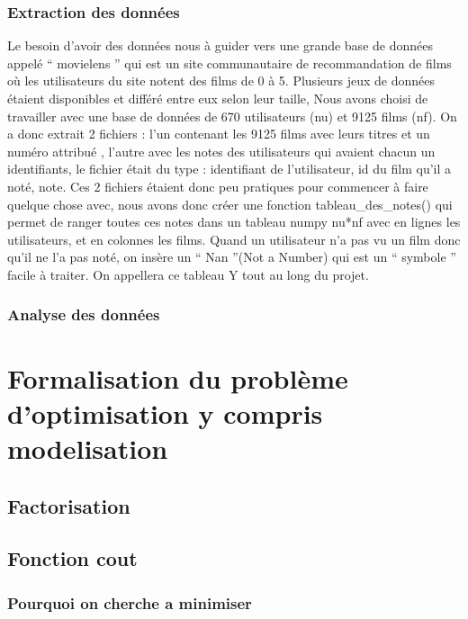\documentclass[a4paper,10pt]{article}
\begin{document}
\subsubsection{Extraction des données}
Le besoin d'avoir des données nous à guider vers une grande base de données appelé `` movielens '' qui est un site communautaire de recommandation de films où les utilisateurs du site notent des films de 0 à 5. 
Plusieurs jeux de données étaient disponibles et différé entre eux selon leur taille, 
Nous avons choisi de travailler avec une base de données de 670 utilisateurs (nu) et 9125 films (nf). 
On a donc extrait 2 fichiers : l’un contenant les 9125 films avec leurs titres et un numéro attribué , 
l’autre avec les notes des utilisateurs qui avaient chacun un identifiants, 
le fichier était du type : identifiant de l’utilisateur, id du film qu’il a noté, note.
Ces 2 fichiers étaient donc peu pratiques pour commencer à faire quelque chose avec, 
nous avons donc créer une fonction tableau\_des\_notes() qui permet de ranger toutes ces notes dans un tableau numpy nu*nf avec en lignes les utilisateurs, 
et en colonnes les films. Quand un utilisateur n’a pas vu un film donc qu’il ne l’a pas noté, 
on insère un `` Nan ''(Not a Number) qui est un `` symbole '' facile à traiter. On appellera ce tableau Y tout au long du projet.

\subsubsection{Analyse des données}
\subsection{}
\section{Formalisation du problème d'optimisation y compris modelisation}
\subsection{Factorisation}
\subsection{Fonction cout}
\subsubsection{Pourquoi on cherche a minimiser}
\end{document}
